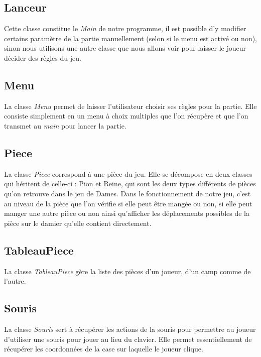 \documentclass[12,french]{report}
\begin{document}
\subsection{Lanceur}

Cette classe constitue le \textit{Main} de notre programme, il est possible d'y modifier certains paramètre de la partie manuellement (selon si le menu est activé ou non), sinon nous utilisons une autre classe que nous allons voir pour laisser le joueur décider des règles du jeu.

\subsection{Menu}

La classe \textit{Menu} permet de laisser l'utilisateur choisir ses règles pour la partie. Elle consiste simplement en un menu à choix multiples que l'on récupère et que l'on transmet au \textit{main} pour lancer la partie.

\subsection{Piece}

La classe \textit{Piece} correspond à une pièce du jeu. Elle se décompose en deux classes qui héritent de celle-ci : Pion et Reine, qui sont les deux types différents de pièces qu'on retrouve dans le jeu de Dames. Dans le fonctionnement de notre jeu, c'est au niveau de la pièce que l'on vérifie si elle peut être mangée ou non, si elle peut manger une autre pièce ou non ainsi qu'afficher les déplacements possibles de la pièce sur le damier qu'elle contient directement.

\subsection{TableauPiece}

La classe \textit{TableauPiece} gère la liste des pièces d'un joueur, d'un camp comme de l'autre.

\subsection{Souris}

La classe \textit{Souris} sert à récupérer les actions de la souris pour permettre au joueur d'utiliser une souris pour jouer au lieu du clavier. Elle permet essentiellement de récupérer les coordonnées de la case sur laquelle le joueur clique. 
\end{document}
